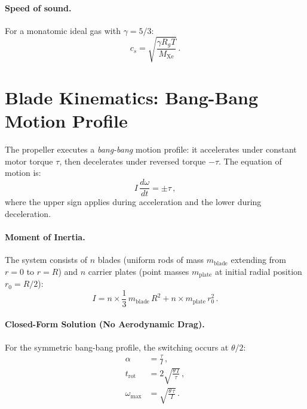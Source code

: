 \documentclass[11pt,a4paper]{article}
\begin{document}
\paragraph{Speed of sound.}
For a monatomic ideal gas with $\gamma = 5/3$:
\begin{equation}
  c_s = \sqrt{\frac{\gamma R_g T}{M_\mathrm{Xe}}}\,.
  \label{eq:cs}
\end{equation}


\section{Blade Kinematics: Bang-Bang Motion Profile}
\label{sec:kinematics}

The propeller executes a \emph{bang-bang} motion profile: it accelerates
under constant motor torque $\tau$, then decelerates under reversed
torque $-\tau$. The equation of motion is:
\begin{equation}
  I\,\frac{d\omega}{dt} = \pm\tau\,,
  \label{eq:EOM}
\end{equation}
where the upper sign applies during acceleration and the lower during
deceleration.

\paragraph{Moment of Inertia.}
The system consists of $n$ blades (uniform rods of mass $m_\mathrm{blade}$
extending from $r = 0$ to $r = R$) and $n$ carrier plates (point masses
$m_\mathrm{plate}$ at initial radial position $r_0 = R/2$):
\begin{equation}
  I = n \times \frac{1}{3}\,m_\mathrm{blade}\,R^2
    + n \times m_\mathrm{plate}\,r_0^2\,.
  \label{eq:I}
\end{equation}

\paragraph{Closed-Form Solution (No Aerodynamic Drag).}
For the symmetric bang-bang profile, the switching occurs at $\theta/2$:
\begin{align}
  \alpha &= \frac{\tau}{I}\,,
    \label{eq:alpha} \\
  t_\mathrm{rot} &= 2\sqrt{\frac{\theta\, I}{\tau}}\,,
    \label{eq:trot} \\
  \omega_\mathrm{max} &= \sqrt{\frac{\theta\,\tau}{I}}\,.
    \label{eq:omega_max}
\end{align}
\end{document}
